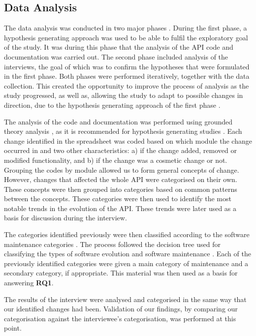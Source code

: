 \documentclass{sig-alternate}
\begin{document}
\subsection{Data Analysis} \label{data_analysis}
The data analysis was conducted in two major phases \cite{andersson2007spiral}. During the first phase, a hypothesis generating approach \cite{seaman1999qualitative} was used to be able to fulfil the exploratory goal of the study. It was during this phase that the analysis of the API code and documentation was carried out. The second phase included analysis of the interviews, the goal of which was to confirm the hypotheses \cite{seaman1999qualitative} that were formulated in the first phase. Both phases were performed iteratively, together with the data collection. This created the opportunity to improve the process of analysis as the study progressed, as well as, allowing the study to adapt to possible changes in direction, due to the hypothesis generating approach of the first phase \cite{andersson2007spiral}. 

The analysis of the code and documentation was performed using grounded theory analysis \cite{seaman1999qualitative}, as it is recommended for hypothesis generating studies \cite{runeson2009guidelines} \cite{seaman1999qualitative}.
Each change identified in the spreadsheet was coded based on which module the change occurred in and two other characteristics: a) if the change added, removed or modified functionality, and b) if the change was a cosmetic change or not.
Grouping the codes by module allowed us to form general concepts of change. However, changes that affected the whole API were categorised on their own.
These concepts were then grouped into categories based on common patterns between the concepts.
These categories were then used to identify the most notable trends in the evolution of the API. These trends were later used as a basis for discussion during the interview.

The categories identified previously were then classified according to the software maintenance categories \cite{chapin2001types}. The process followed the decision tree used for classifying the types of software evolution and software maintenance \cite{chapin2001types}. Each of the previously identified categories were given a main category of maintenance and a secondary category, if appropriate. This material was then used as a basis for answering \textbf{RQ1}.

The results of the interview were analysed and categorised in the same way that our identified changes had been. Validation of our findings, by comparing our categorisation against the interviewee's categorisation, was performed at this point. 
\end{document}
